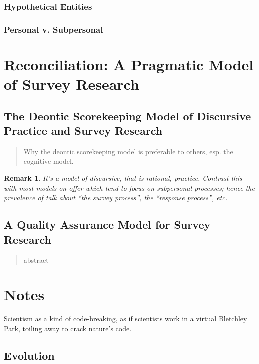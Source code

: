 \documentclass[11pt,twoside]{article}
\newtheorem{remark}{Remark}
\newcommand{\SR}{Survey Research}
\begin{document}
\subsubsection{Hypothetical Entities}

\subsubsection{Personal v. Subpersonal}

\section{Reconciliation: A Pragmatic Model of Survey Research}

\subsection{The Deontic Scorekeeping Model of Discursive Practice and \SR{}}

\begin{abstract}
Why the deontic scorekeeping model is preferable to others, esp. the
cognitive model.
\end{abstract}

\begin{remark}
  It's a model of discursive, that is rational, practice.  Contrast
  this with most models on offer which tend to focus on subpersonal
  processes; hence the prevalence of talk about ``the survey
  process'', the ``response process'', etc.
\end{remark}

\subsection{A Quality Assurance Model for \SR{}}

\begin{abstract}
abstract
\end{abstract}

\section{Notes}

Scientism as a kind of code-breaking, as if scientists work in a
virtual Bletchley Park, toiling away to crack nature's code.

\subsection{Evolution}
\end{document}
